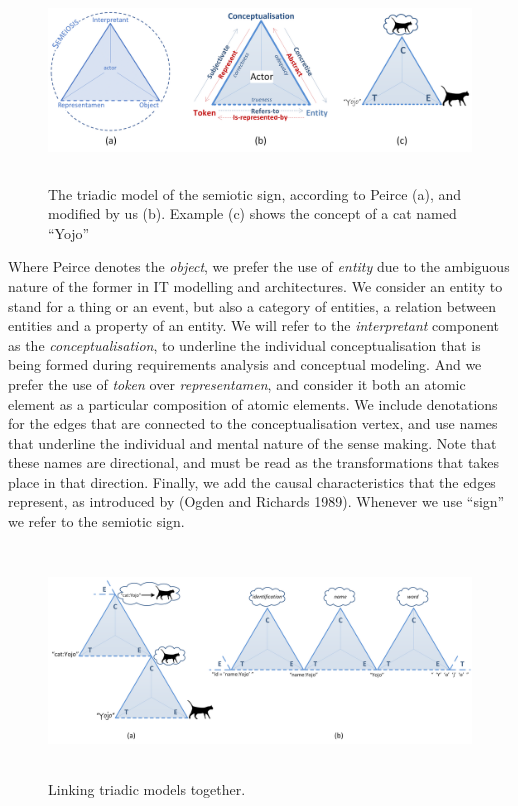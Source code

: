\documentclass[a4paper,11pt,oneside,oldfontcommands]{memoir}
\theoremstyle{definition}
\theoremstyle{break}		%
\numberwithin{equation}{chapter}
\numberwithin{figure}{chapter}
\begin{document}
\begin{figure}
\hypertarget{fig:semiotic-triangles}{%
\centering
\includegraphics[width=6.25in,height=2.08333in]{src/images/SemioticTriangles.png}
\caption{The triadic model of the semiotic sign, according to Peirce
(a), and modified by us (b). Example (c) shows the concept of a cat
named ``Yojo''}\label{fig:semiotic-triangles}
}
\end{figure}

Where Peirce denotes the \emph{object}, we prefer the use of
\emph{entity} due to the ambiguous nature of the former in IT modelling
and architectures. We consider an entity to stand for a thing or an
event, but also a category of entities, a relation between entities and
a property of an entity. We will refer to the \emph{interpretant}
component as the \emph{conceptualisation}, to underline the individual
conceptualisation that is being formed during requirements analysis and
conceptual modeling. And we prefer the use of \emph{token} over
\emph{representamen}, and consider it both an atomic element as a
particular composition of atomic elements. We include denotations for
the edges that are connected to the conceptualisation vertex, and use
names that underline the individual and mental nature of the sense
making. Note that these names are directional, and must be read as the
transformations that takes place in that direction. Finally, we add the
causal characteristics that the edges represent, as introduced by (Ogden
and Richards 1989). Whenever we use ``sign'' we refer to the semiotic
sign.

\begin{figure}
\hypertarget{fig:linked-triangles}{%
\centering
\includegraphics[width=6.25in,height=2.39583in]{src/images/LinkedTriangles.png}
\caption{Linking triadic models together.}\label{fig:linked-triangles}
}
\end{figure}
\end{document}
